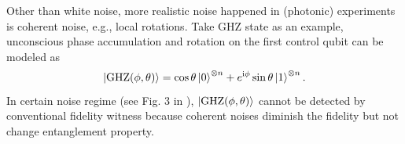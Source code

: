 \documentclass[
aps,
pra,
twocolumn,
floatfix,
]{revtex4-2}
\theoremstyle{plain}
\theoremstyle{definition}
\newcommand{\ghz}{\text{GHZ}}
\begin{document}
Other than white noise, more realistic noise happened in (photonic) experiments is coherent noise, e.g., local rotations.
Take GHZ state as an example, unconscious phase accumulation and 
rotation on the first control qubit can be modeled as 
\cite{zhouEntanglementDetectionCoherent2020}
\begin{equation}
	\ket{\ghz(\phi,\theta)}=
	\cos\theta\ket{0}^{\otimes n}+e^{\ii \phi}\sin\theta\ket{1}^{\otimes n}.
	\label{eq:coherent_noise}
\end{equation}
In certain noise regime (see Fig. 3 in \cite{zhouEntanglementDetectionCoherent2020}), $\ket{\ghz(\phi,\theta)}$ cannot be detected by conventional fidelity witness because coherent noises diminish the fidelity but not change entanglement property.
\end{document}
